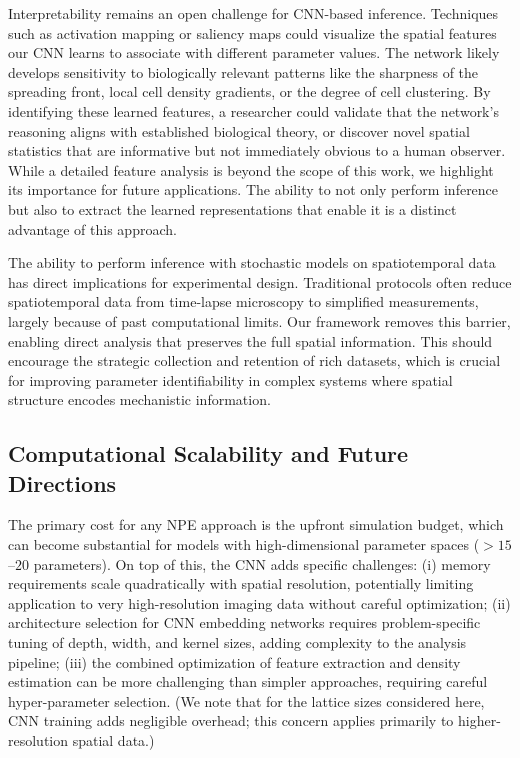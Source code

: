 \documentclass{article}
\begin{document}
Interpretability remains an open challenge for CNN-based inference. Techniques such as activation mapping \cite{2023arXiv230914304M} or saliency maps \citep{2019arXiv191111293M} could visualize the spatial features our CNN learns to associate with different parameter values. The network likely develops sensitivity to biologically relevant patterns like the sharpness of the spreading front, local cell density gradients, or the degree of cell clustering. By identifying these learned features, a researcher could validate that the network's reasoning aligns with established biological theory, or discover novel spatial statistics that are informative but not immediately obvious to a human observer. While a detailed feature analysis is beyond the scope of this work, we highlight its importance for future applications. The ability to not only perform inference but also to extract the learned representations that enable it is a distinct advantage of this approach.

The ability to perform inference with stochastic models on spatiotemporal data has direct implications for experimental design. Traditional protocols often reduce spatiotemporal data from time-lapse microscopy to simplified measurements, largely because of past computational limits. Our framework removes this barrier, enabling direct analysis that preserves the full spatial information. This should encourage the strategic collection and retention of rich datasets, which is crucial for improving parameter identifiability in complex systems where spatial structure encodes mechanistic information.

\subsection{Computational Scalability and Future Directions}

The primary cost for any NPE approach is the upfront simulation budget, which can become substantial for models with high-dimensional parameter spaces ($> 15$--$20$ parameters). On top of this, the CNN adds specific challenges: (i) memory requirements scale quadratically with spatial resolution, potentially limiting application to very high-resolution imaging data without careful optimization; (ii) architecture selection for CNN embedding networks requires problem-specific tuning of depth, width, and kernel sizes, adding complexity to the analysis pipeline; (iii) the combined optimization of feature extraction and density estimation can be more challenging than simpler approaches, requiring careful hyper-parameter selection. (We note that for the lattice sizes considered here, CNN training adds negligible overhead; this concern applies primarily to higher-resolution spatial data.)
\end{document}
